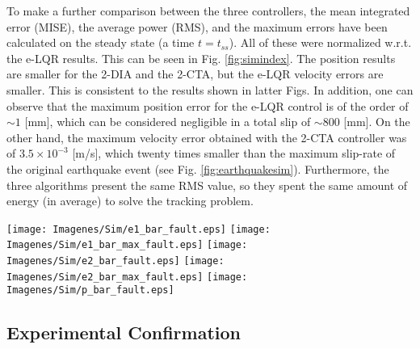 \documentclass[journal,twoside,web]{ieeecolor}
\begin{document}
To make a further comparison between the three controllers, the mean integrated error (MISE), the average power (RMS), and the maximum errors have been calculated on the steady state (a time $t=t_{ss}$). All of these were normalized w.r.t. the e-LQR results. This can be seen in Fig. \ref{fig:simindex}. The position results are smaller for the 2-DIA and the 2-CTA, but the e-LQR velocity errors are smaller. This is consistent to the results shown in latter Figs. In addition, one can observe that the maximum position error for the e-LQR control is of the order of $\sim 1$ [mm], which can be considered negligible in a total slip of $\sim 800$ [mm]. On the other hand, the maximum velocity error obtained with the 2-CTA controller was of $3.5 \times 10^{-3}$ [m/s], which twenty times smaller than the maximum slip-rate of the original earthquake event (see Fig. \ref{fig:earthquakesim}). Furthermore, the three algorithms present the same RMS value, so they spent the same amount of energy (in average) to solve the tracking problem. 

\begin{figure*}[ht!]
  \centering 
  \texttt{[image: Imagenes/Sim/e1\_bar\_fault.eps]}
  \texttt{[image: Imagenes/Sim/e1\_bar\_max\_fault.eps]}
  \texttt{[image: Imagenes/Sim/e2\_bar\_fault.eps]}
  \texttt{[image: Imagenes/Sim/e2\_bar\_max\_fault.eps]}
  \texttt{[image: Imagenes/Sim/p\_bar\_fault.eps]}
  \caption{Errors and average power comparison in the simulations.}
  \label{fig:simindex}
\end{figure*}

\subsection{Experimental Confirmation}
\end{document}
